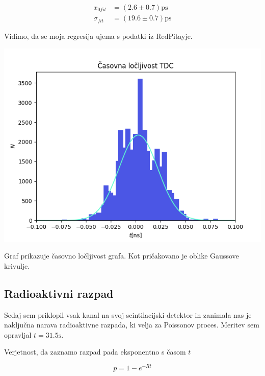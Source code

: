 \documentclass[11pt]{article}
\begin{document}
\begin{align*}
x_{0fit} &= (2.6 \pm 0.7) \mathrm{ps} \\
\sigma_{fit} &= (19.6 \pm 0.7) \mathrm{ps}
\end{align*}

Vidimo, da se moja regresija ujema s podatki iz RedPitayje.

\begin{slika}[H]
  \centering
  \includegraphics[width=.9\linewidth]{figures/casovna_locljivost.png}
  \caption{\small Graf prikazuje časovno ločljivost grafa. Kot pričakovano je oblike Gaussove krivulje.}\label{fig:casloc}
\end{slika}

\subsection{Radioaktivni razpad}\label{sec:orgb5a1d2e}

Sedaj sem priklopil vsak kanal na svoj scintilacijski detektor in zanimala nas je naključna narava radioaktivne razpada, ki velja za Poissonov proces. Meritev sem opravljal \(t = 31.5 \mathrm{s}\).

Verjetnost, da zaznamo razpad pada eksponentno s časom \(t\)

\begin{equation}
\label{eq:1}
p = 1 - e^{-Rt}
\end{equation}
\end{document}
